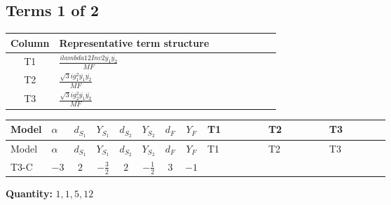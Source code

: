 \documentclass[8pt]{article}
\begin{document}
\begin{landscape}
\subsection*{Terms 1 of 2}
\begin{center}
\begin{tabular}{@{}c >{\raggedright\arraybackslash}p{0.82\linewidth}@{}}
\toprule
Column & Representative term structure \\
\midrule
T1 & \(\displaystyle \frac{i lambda12Inv2 \overline{y_{1}} \overline{y_{2}}}{MF}\) \\
\midrule
T2 & \(\displaystyle \frac{\sqrt{3} i g_{1}^{2} \overline{y_{1}} \overline{y_{2}}}{MF}\) \\
\midrule
T3 & \(\displaystyle \frac{\sqrt{3} i g_{2}^{2} \overline{y_{1}} \overline{y_{2}}}{MF}\) \\
\midrule
\bottomrule
\end{tabular}
\end{center}
\smallskip
\tiny
\begin{longtable}{@{}llcccccc >{\raggedright\arraybackslash}p{0.21\linewidth} >{\raggedright\arraybackslash}p{0.21\linewidth} >{\raggedright\arraybackslash}p{0.21\linewidth}@{}}
\toprule
Model & $\alpha$ & $d_{S_1}$ & $Y_{S_1}$ & $d_{S_2}$ & $Y_{S_2}$ & $d_F$ & $Y_F$ & T1 & T2 & T3 \\
\midrule
\endfirsthead
\toprule
Model & $\alpha$ & $d_{S_1}$ & $Y_{S_1}$ & $d_{S_2}$ & $Y_{S_2}$ & $d_F$ & $Y_F$ & T1 & T2 & T3 \\
\midrule
\endhead
T3-C & $-3$ & $2$ & $-\frac{3}{2}$ & $2$ & $-\frac{1}{2}$ & $3$ & $-1$ & \scriptsize\adjustbox{max width=\linewidth}{$\begin{gathered} \frac{i lambda12Inv2 \overline{y_{1}} \overline{y_{2}}}{3 MF}\end{gathered}$} & \scriptsize\adjustbox{max width=\linewidth}{$\begin{gathered} \frac{\sqrt{3} i g_{1}^{2} \overline{y_{1}} \overline{y_{2}}}{2 MF}\end{gathered}$} & \scriptsize\adjustbox{max width=\linewidth}{$\begin{gathered} \frac{\sqrt{3} i g_{2}^{2} \overline{y_{1}} \overline{y_{2}}}{4 MF}\end{gathered}$} \\
\midrule
\bottomrule
\end{longtable}
\clearpage
\noindent\textbf{Quantity: }$\mathrm{1,1,5,12}$\par\smallskip

\end{landscape}
\end{document}
